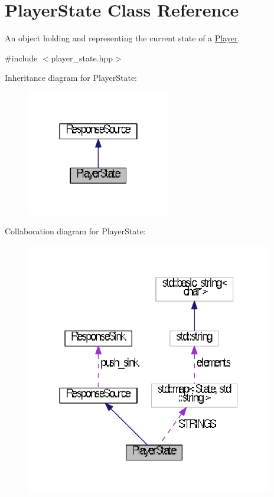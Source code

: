 \hypertarget{classPlayerState}{\section{Player\+State Class Reference}
\label{classPlayerState}
}


An object holding and representing the current state of a \hyperlink{classPlayer}{Player}.  




{\ttfamily \#include $<$player\+\_\+state.\+hpp$>$}



Inheritance diagram for Player\+State\+:
\nopagebreak
\begin{figure}[H]
\begin{center}
\leavevmode
\includegraphics[width=178pt]{classPlayerState__inherit__graph}
\end{center}
\end{figure}


Collaboration diagram for Player\+State\+:
\nopagebreak
\begin{figure}[H]
\begin{center}
\leavevmode
\includegraphics[width=306pt]{classPlayerState__coll__graph}
\end{center}
\end{figure}
